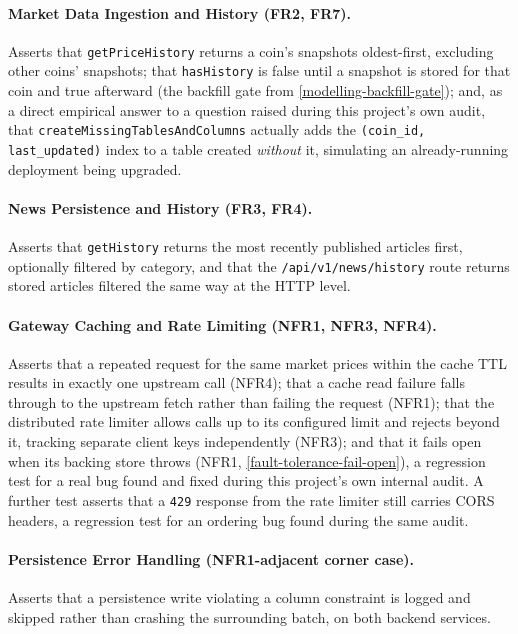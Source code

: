 \documentclass{scrartcl}
\begin{document}
\paragraph{Market Data Ingestion and History (FR2, FR7).} Asserts that
\texttt{getPriceHistory} returns a coin's snapshots oldest-first, excluding other coins'
snapshots; that \texttt{hasHistory} is false until a snapshot is stored for that coin and true
afterward (the backfill gate from \cref{modelling-backfill-gate}); and, as a direct empirical
answer to a question raised during this project's own audit, that
\texttt{createMissingTablesAndColumns} actually adds the \texttt{(coin\_id, last\_updated)} index
to a table created \emph{without} it, simulating an already-running deployment being upgraded.

\paragraph{News Persistence and History (FR3, FR4).} Asserts that \texttt{getHistory} returns
the most recently published articles first, optionally filtered by category, and that the
\texttt{/api/v1/news/history} route returns stored articles filtered the same way at the HTTP
level.

\paragraph{Gateway Caching and Rate Limiting (NFR1, NFR3, NFR4).} Asserts that a repeated
request for the same market prices within the cache TTL results in exactly one upstream call
(NFR4); that a cache read failure falls through to the upstream fetch rather than failing the
request (NFR1); that the distributed rate limiter allows calls up to its configured limit and
rejects beyond it, tracking separate client keys independently (NFR3); and that it fails open
when its backing store throws (NFR1, \cref{fault-tolerance-fail-open}), a regression test for a
real bug found and fixed during this project's own internal audit. A further test asserts that a
\texttt{429} response from the rate limiter still carries CORS headers, a regression test for an
ordering bug found during the same audit.

\paragraph{Persistence Error Handling (NFR1-adjacent corner case).} Asserts that a persistence
write violating a column constraint is logged and skipped rather than crashing the surrounding
batch, on both backend services.
\end{document}
